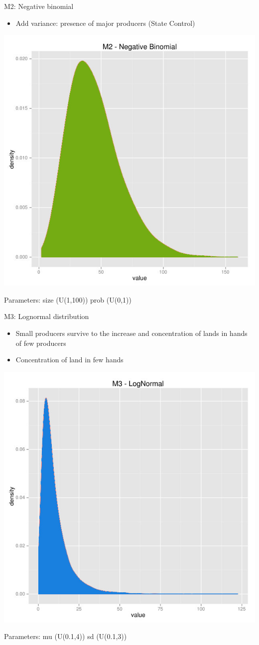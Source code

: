 \documentclass[12pt, handout=show,notes=show]{beamer}
\begin{document}
\begin{frame}{M2: Negative binomial}
\begin{itemize}
\item Add variance: presence of major producers (State Control)
\end{itemize}
\begin{center}
		\includegraphics[height=0.5\textwidth]{./negative.jpg}
		\vfill
	
\end{center}	
\begin{center}
\tiny Parameters: size (U(1,100)) prob (U(0,1))
\end{center}

\end{frame}

\begin{frame}{M3: Lognormal distribution}
\begin{itemize}
\item Small producers survive to the increase and concentration of lands in hands of few producers
\item Concentration of land in few hands 
\end{itemize}
\begin{center}
		\includegraphics[height=0.5\textwidth]{./lognormal.jpg}
		\vfill
	
\end{center}	
\begin{center}
\tiny Parameters: mu (U(0.1,4)) sd (U(0.1,3))
\end{center}

\end{frame}
\end{document}
